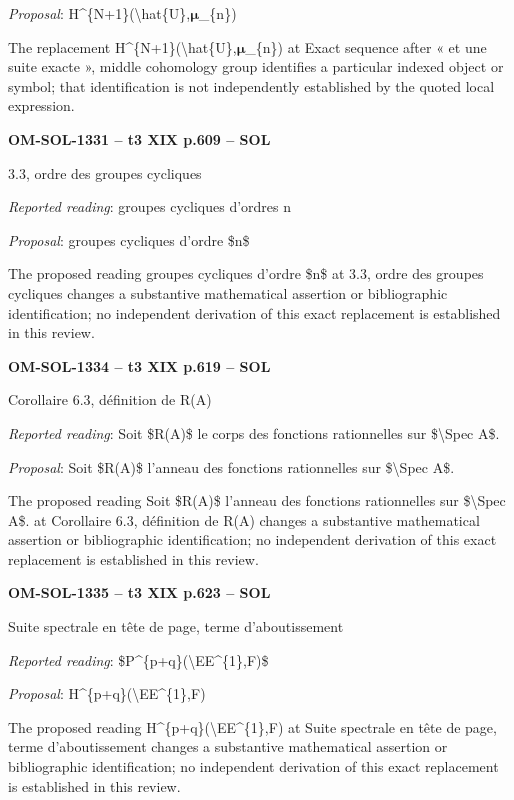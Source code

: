 \emph{Proposal}: H\textasciicircum{}\{N+1\}(\textbackslash{}hat\{U\},\ensuremath{𝛍}\_\{n\})\par
The replacement H\textasciicircum{}\{N+1\}(\textbackslash{}hat\{U\},\ensuremath{𝛍}\_\{n\}) at Exact sequence after « et une suite exacte », middle cohomology group identifies a particular indexed object or symbol; that identification is not independently established by the quoted local expression.\par
\par\noindent\textbf{OM-SOL-1331 -- t3 XIX p.609 -- SOL}\par
3.3, ordre des groupes cycliques\par
\emph{Reported reading}: groupes cycliques d'ordres n\par
\emph{Proposal}: groupes cycliques d'ordre \$n\$\par
The proposed reading groupes cycliques d'ordre \$n\$ at 3.3, ordre des groupes cycliques changes a substantive mathematical assertion or bibliographic identification; no independent derivation of this exact replacement is established in this review.\par
\par\noindent\textbf{OM-SOL-1334 -- t3 XIX p.619 -- SOL}\par
Corollaire 6.3, définition de R(A)\par
\emph{Reported reading}: Soit \$R(A)\$ le corps des fonctions rationnelles sur \$\textbackslash{}Spec A\$.\par
\emph{Proposal}: Soit \$R(A)\$ l'anneau des fonctions rationnelles sur \$\textbackslash{}Spec A\$.\par
The proposed reading Soit \$R(A)\$ l'anneau des fonctions rationnelles sur \$\textbackslash{}Spec A\$. at Corollaire 6.3, définition de R(A) changes a substantive mathematical assertion or bibliographic identification; no independent derivation of this exact replacement is established in this review.\par
\par\noindent\textbf{OM-SOL-1335 -- t3 XIX p.623 -- SOL}\par
Suite spectrale en tête de page, terme d'aboutissement\par
\emph{Reported reading}: \$P\textasciicircum{}\{p+q\}(\textbackslash{}EE\textasciicircum{}\{1\},F)\$\par
\emph{Proposal}: H\textasciicircum{}\{p+q\}(\textbackslash{}EE\textasciicircum{}\{1\},F)\par
The proposed reading H\textasciicircum{}\{p+q\}(\textbackslash{}EE\textasciicircum{}\{1\},F) at Suite spectrale en tête de page, terme d'aboutissement changes a substantive mathematical assertion or bibliographic identification; no independent derivation of this exact replacement is established in this review.\par
